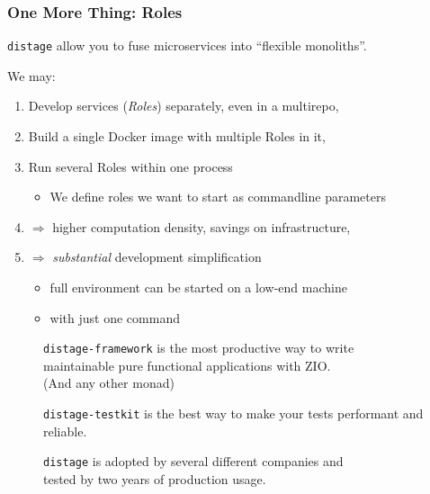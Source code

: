 \documentclass[usenames,dvipsnames,aspectratio=169]{beamer}
\newcommand{\distage}{\texttt{distage}\xspace}
\begin{document}
\begin{frame}
  \frametitle{One More Thing: Roles}
  \distage allow you to fuse microservices into ``flexible monoliths''.

  \vspace{0.3cm}
  We may:
  \begin{enumerate}
  \item Develop services (\textit{Roles}) separately, even in a multirepo,
  \item Build a single Docker image with multiple Roles in it,
  \item Run several Roles within one process
    \begin{itemize}
        \item We define roles we want to start as commandline parameters
    \end{itemize}
  \item $\Rightarrow$ higher computation density, savings on infrastructure,
  \item $\Rightarrow$ \textit{substantial} development simplification
      \begin{itemize}
        \item full environment can be started on a low-end machine
        \item with just one command
    \end{itemize}
  \end{enumerate}
\end{frame}

\begin{frame}
  \begin{figure}
    \texttt{distage-framework} is the most productive way to write \\
    maintainable pure functional applications with ZIO. \\
    (And any other monad)
  \end{figure}
  \begin{figure}
    \texttt{distage-testkit} is the best way to make your tests performant and reliable.
  \end{figure}
  \begin{figure}
    \distage is adopted by several different companies and \\
    tested by two years of production usage.
  \end{figure}
\end{frame}
\end{document}
